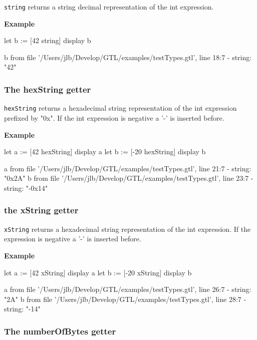 \documentclass[10pt,openright,twosides]{report}
\newcommand{\gtltype}[1]{{\small\ttfamily #1}}
\newcommand{\ccst}[1]{{\footnotesize\ttfamily\colorbox{light-blue}{'#1'}}}
\newcommand{\scst}[1]{{\footnotesize\ttfamily\colorbox{light-blue}{"#1"}}}
\newcommand{\gtlinline}[1]{\colorbox{light-blue}{\lstinline[language=gtl]{#1}}}
\newcommand{\example}{\vspace{.75em}\noindent\textbf{Example}\vspace{0em}}
\begin{document}
\gtlinline{string} returns a string decimal representation of the \gtltype{int} expression. 

\example
\begin{gtl}
let b := [42 string]
display b
\end{gtl}
\begin{console}
b from file '/Users/jlb/Develop/GTL/examples/testTypes.gtl', line 18:7
  - string: "42"
\end{console}


\subsubsection{The {\bfseries\ttfamily hexString} getter}

\gtlinline{hexString} returns a hexadecimal string representation of the int expression prefixed by \scst{0x}. If the int expression is negative a \ccst{-} is inserted before.

\example
\begin{gtl}
let a := [42 hexString]
display a
let b := [-20 hexString]
display b
\end{gtl}
\begin{console}
a from file '/Users/jlb/Develop/GTL/examples/testTypes.gtl', line 21:7
  - string: "0x2A"
b from file '/Users/jlb/Develop/GTL/examples/testTypes.gtl', line 23:7
  - string: "-0x14"
\end{console}

\subsubsection{the {\bfseries\ttfamily xString} getter}

\gtlinline{xString} returns a hexadecimal string representation of the int expression. If the expression is negative a \ccst{-} is inserted before.

\example
\begin{gtl}
let a := [42 xString]
display a
let b := [-20 xString]
display b
\end{gtl}
\begin{console}
a from file '/Users/jlb/Develop/GTL/examples/testTypes.gtl', line 26:7
  - string: "2A"
b from file '/Users/jlb/Develop/GTL/examples/testTypes.gtl', line 28:7
  - string: "-14"
\end{console}

\subsubsection{The {\bfseries\ttfamily numberOfBytes} getter}
\end{document}

